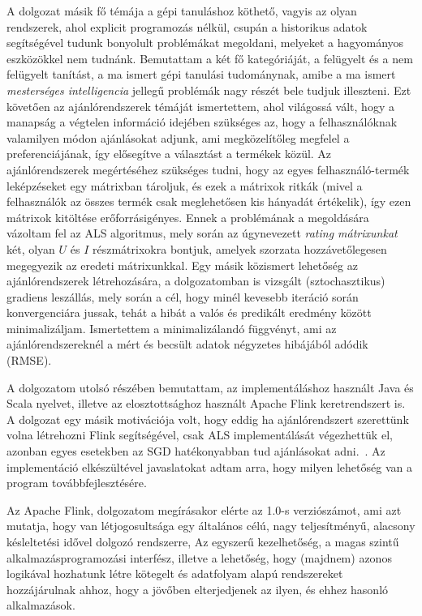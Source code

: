 \documentclass[a4paper,12pt]{article}
\begin{document}
A dolgozat másik fő témája a gépi tanuláshoz köthető, vagyis az olyan rendszerek, ahol explicit programozás nélkül, csupán a historikus adatok segítségével tudunk bonyolult problémákat megoldani, melyeket a hagyományos eszközökkel nem tudnánk. Bemutattam a két fő kategóriáját, a felügyelt és a nem felügyelt tanítást, a ma ismert gépi tanulási tudománynak, amibe a ma ismert \textsl{mesterséges intelligencia} jellegű problémák nagy részét bele tudjuk illeszteni.  Ezt követően az ajánlórendszerek témáját ismertettem, ahol világossá vált, hogy a manapság a végtelen információ idejében szükséges az, hogy a felhasználóknak valamilyen módon ajánlásokat adjunk, ami megközelítőleg megfelel a preferenciájának, így elősegítve a választást a termékek közül. Az ajánlórendszerek megértéséhez szükséges tudni, hogy az egyes felhasználó-termék leképzéseket egy mátrixban tároljuk, és ezek a mátrixok ritkák (mivel a felhasználók az összes termék csak meglehetősen kis hányadát értékelik), így ezen mátrixok kitöltése erőforrásigényes.
\newline
Ennek a problémának a megoldására vázoltam fel az ALS algoritmus, mely során az úgynevezett \textsl{rating mátrixunkat} két, olyan $U$ és $I$ részmátrixokra bontjuk, amelyek szorzata hozzávetőlegesen megegyezik az eredeti 
mátrixunkkal. 
Egy másik közismert lehetőség az ajánlórendszerek létrehozására, a dolgozatomban is vizsgált (sztochasztikus) gradiens leszállás, mely során a cél, hogy minél kevesebb iteráció során konvergenciára jussak, tehát a hibát a valós és predikált eredmény között minimalizáljam. Ismertettem a minimalizálandó függvényt, ami az ajánlórendszereknél a mért és becsült adatok négyzetes hibájából adódik (RMSE).  
\newline

A dolgozatom utolsó részében bemutattam, az implementáláshoz használt Java és Scala nyelvet, illetve az elosztottsághoz használt Apache Flink keretrendszert is. A dolgozat egy másik motivációja volt, hogy eddig ha ajánlórendszert szerettünk volna létrehozni Flink segítségével, csak ALS implementálását végezhettük el, azonban egyes esetekben az SGD hatékonyabban tud ajánlásokat adni.~\parencite{alsgd}. Az implementáció elkészültével javaslatokat adtam arra, hogy milyen lehetőség van a program továbbfejlesztésére.
\newline

Az Apache Flink, dolgozatom megírásakor elérte az 1.0-s verziószámot, ami azt mutatja, hogy van létjogosultsága egy általános célú, nagy teljesítményű, alacsony késleltetési idővel dolgozó rendszerre, Az egyszerű kezelhetőség, a magas szintű alkalmazásprogramozási interfész, illetve a lehetőség, hogy (majdnem) azonos logikával hozhatunk létre kötegelt és adatfolyam alapú rendszereket hozzájárulnak ahhoz, hogy a jövőben elterjedjenek az ilyen, és ehhez hasonló alkalmazások.
\end{document}
